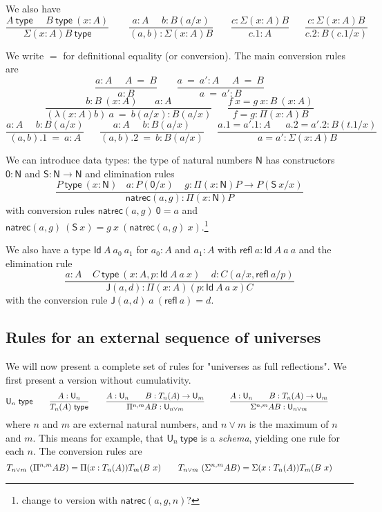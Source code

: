 \documentclass[11pt,a4paper]{article}
\newcommand{\refl}{\mathsf{refl}}
\newcommand{\Id}{\mathsf{Id}}
\newcommand{\conv}{=}
\def\NN{\mathsf{N}}
\def\UU{\mathsf{U}}
\def\JJ{\mathsf{J}}
\def\ZERO{\mathsf{0}}
\def\SUCC{\mathsf{S}}
\newcommand{\type}{\mathsf{type}}
\newcommand{\T}{\mathsf{T}}
\newcommand{\natrec}{\mathsf{natrec}}
\begin{document}
We also have
$$
\frac{A~\type~~~~~~B~\type~(x:A)}{\Sigma (x:A) B~\type}~~~~~~~~~
\frac{a:A~~~~~~b:B(a/x)}{(a,b):\Sigma (x:A) B}~~~~~~~~
\frac{c:\Sigma (x:A) B}{c.1:A}~~~~~~~
\frac{c:\Sigma (x:A) B}{c.2:B(c.1/x)}
$$

We write $\conv$ for definitional equality (or conversion). The main conversion rules are 
$$
\frac{ a:A~~~~~~ A~ \conv~ B}{ a:B}~~~~~~~~~
\frac{ a ~\conv~a':A~~~~~~ A  ~\conv~ B}{ a ~\conv~a':B}
$$
$$
\frac{b:B~(x:A)~~~~~~~~ a:A}{ (\lambda (x:A)b)~a  ~\conv~ b(a/x):B(a/x)}
~~~~~~~
\frac{f~x = g~x:B~(x:A)}{ f = g : \Pi (x:A)B}
$$
$$
\frac{ a:A~~~~~~ b:B(a/x)}{ (a,b).1  ~\conv~ a:A}
~~~~~~~
\frac{ a:A~~~~~~ b:B(a/x)}{ (a,b).2  ~\conv~ b:B(a/x)}~~~~~~
\frac{ a.1 = a'.1:A~~~~~~~ a.2 = a'.2:B(t.1/x)}{ a = a' : \Sigma (x:A)B}
$$

We can introduce data types: the type of natural numbers $\NN$ has
constructors $\ZERO:\NN$ and $\SUCC:\NN\rightarrow\NN$ and elimination rules
$$
\frac{P~\type~(x:\NN)~~~~a:P(\ZERO/x)~~~~~g:\Pi (x:\NN)P\rightarrow P(\SUCC~x/x)}{\natrec(a,g):\Pi (x:\NN)P}
$$
with conversion rules $\natrec(a,g)~\ZERO = a$ and $\natrec(a,g)~(\SUCC~x) = g~x~(\natrec(a,g)~x)$.\footnote{change to version with $\natrec(a,g,n)$?}

We also have a type $\Id~A~a_0~a_1$ for $a_0:A$ and $a_1:A$ with $\refl~a:\Id~A~a~a$
and the elimination rule
$$\frac{a:A~~~~~C~\type~(x:A,p:\Id~A~a~x)~~~~~d:C(a/x,\refl~a/p)}{\JJ (a,d):\Pi (x:A)(p:\Id~A~a~x)C}$$
with the conversion rule $\JJ(a,d)~a~(\refl~a) = d$.

\subsection*{Rules for an external sequence of universes}

We will now present a complete set of rules for "universes as full reflections". We first present a version without cumulativity.
$$
\UU_n~\type~~~~~~
\frac{A:\UU_{n}}{\\T_{n}(A)~\type}~~~~~~
\frac{A:\UU_{n}~~~~~~B:\\T_{n}(A)\rightarrow \UU_{m}}
     {\Pi^{n,m} A B:\UU_{n\vee m}}~~~~~~~~~
\frac{A:\UU_{n}~~~~~~B:\\T_{n}(A)\rightarrow \UU_{m}}
     {\Sigma^{n,m} A B:\UU_{n\vee m}}~~~~~~~~~
$$
where $n$ and $m$ are external natural numbers, and $n \vee m$ is the maximum of $n$ and $m$. This means for example, that $\UU_n~\type$ is a {\em schema}, yielding one rule for each $n$.
The conversion rules are
$$
\\T_{n\vee m}~(\Pi^{n,m} A B) = \Pi (x:\\T_{n}(A)) \\T_{m}(B~x)~~~~~~~
\\T_{n\vee m}~(\Sigma^{n,m} A B) = \Sigma (x:\\T_{n}(A)) \\T_{m}(B~x)~~~~~~~
$$
\end{document}

